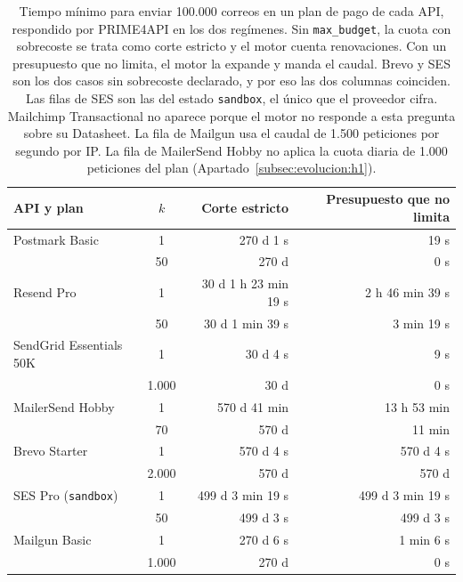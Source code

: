 \begin{table}[H]
\centering
\small
\begin{tabular}{|l|c|r|r|}
\hline
\textbf{API y plan} & \textbf{$k$} & \textbf{Corte estricto} & \textbf{Presupuesto que no limita} \\
\hline
Postmark Basic          & 1     & 270 d 1 s            & 19 s \\
                        & 50    & 270 d                & 0 s \\
\hline
Resend Pro              & 1     & 30 d 1 h 23 min 19 s & 2 h 46 min 39 s \\
                        & 50    & 30 d 1 min 39 s      & 3 min 19 s \\
\hline
SendGrid Essentials 50K & 1     & 30 d 4 s             & 9 s \\
                        & 1.000 & 30 d                 & 0 s \\
\hline
MailerSend Hobby        & 1     & 570 d 41 min         & 13 h 53 min \\
                        & 70    & 570 d                & 11 min \\
\hline
Brevo Starter           & 1     & 570 d 4 s            & 570 d 4 s \\
                        & 2.000 & 570 d                & 570 d \\
\hline
SES Pro (\texttt{sandbox}) & 1  & 499 d 3 min 19 s     & 499 d 3 min 19 s \\
                        & 50    & 499 d 3 s            & 499 d 3 s \\
\hline
Mailgun Basic           & 1     & 270 d 6 s            & 1 min 6 s \\
                        & 1.000 & 270 d                & 0 s \\
\hline
\end{tabular}
\caption[Tiempo mínimo para 100.000 correos con corte estricto y con presupuesto que no limita]{Tiempo mínimo para enviar 100.000 correos en un plan de pago de cada API, respondido por PRIME4API \citep{prime4apirepo} en los dos regímenes. Sin \texttt{max\_budget}, la cuota con sobrecoste se trata como corte estricto y el motor cuenta renovaciones. Con un presupuesto que no limita, el motor la expande y manda el caudal. Brevo y SES son los dos casos sin sobrecoste declarado, y por eso las dos columnas coinciden. Las filas de SES son las del estado \texttt{sandbox}, el único que el proveedor cifra. Mailchimp Transactional no aparece porque el motor no responde a esta pregunta sobre su Datasheet. La fila de Mailgun usa el caudal de 1.500 peticiones por segundo por IP. La fila de MailerSend Hobby no aplica la cuota diaria de 1.000 peticiones del plan (Apartado~\ref{subsec:evolucion:h1}).}
\label{tab:a06-presupuesto}
\end{table}

